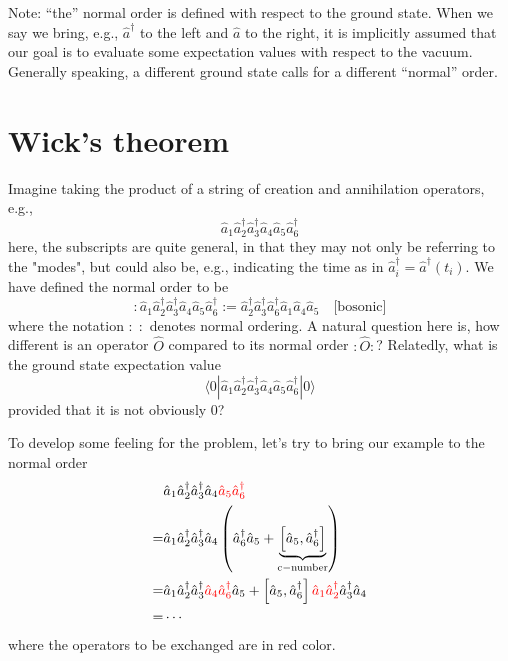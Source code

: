 Note: ``the'' normal order is defined with respect to the ground state. When we say we bring, e.g., $\hat{a}^\dagger$ to the left and $\hat{a}$ to the right, it is implicitly assumed that our goal is to evaluate some expectation values with respect to the vacuum. Generally speaking, a different ground state calls for a different ``normal'' order.

\section{Wick's theorem}

Imagine taking the product of a string of creation and annihilation operators, e.g.,
\[ \hat{a}_1\hat{a}_{2}^{\dagger}\hat{a}_{3}^{\dagger}\hat{a}_4\hat{a}_5\hat{a}_{6}^{\dagger}\]
here, the subscripts are quite general, in that they may not only be referring to the "modes", but could also be, e.g., indicating the time as in $\hat{a}_{i}^{\dagger}=\hat{a}^{\dagger}\left( t_i \right)$. We have defined the normal order to be
\[ :\hat{a}_1\hat{a}_{2}^{\dagger}\hat{a}_{3}^{\dagger}\hat{a}_4\hat{a}_5\hat{a}_{6}^{\dagger}:=\hat{a}_{2}^{\dagger}\hat{a}_{3}^{\dagger}\hat{a}_{6}^{\dagger}\hat{a}_1\hat{a}_4\hat{a}_5\quad [\mathrm{bosonic]}\]
where the notation $:\;:$ denotes normal ordering. A natural question here is, how different is an operator $\hat{O}$ compared to its normal order $:\hat{O}:$? Relatedly, what is the ground state expectation value
\[ \langle 0|\hat{a}_1\hat{a}_{2}^{\dagger}\hat{a}_{3}^{\dagger}\hat{a}_4\hat{a}_5\hat{a}_{6}^{\dagger}|0\rangle \]
provided that it is not obviously $0$?

To develop some feeling for the problem, let's try to bring our example to the normal order
\begin{align*}
    &\hat{a}_1\hat{a}_{2}^{\dagger}\hat{a}_{3}^{\dagger}\hat{a}_4{\color{red} \hat{a}_5\hat{a}_{6}^{\dagger}}\\
    =&\hat{a}_1\hat{a}_{2}^{\dagger}\hat{a}_{3}^{\dagger}\hat{a}_4\left( \hat{a}_{6}^{\dagger}\hat{a}_5+\underset{\mathrm{c}-\mathrm{number}}{\underbrace{\left[ \hat{a}_5,\hat{a}_{6}^{\dagger} \right] }} \right) \\
    =&\hat{a}_1\hat{a}_{2}^{\dagger}\hat{a}_{3}^{\dagger}{\color{red} \hat{a}_4\hat{a}_{6}^{\dagger}}\hat{a}_5+\left[ \hat{a}_5,\hat{a}_{6}^{\dagger} \right] {\color{red} \hat{a}_1\hat{a}_{2}^{\dagger}}\hat{a}_{3}^{\dagger}\hat{a}_4\\
    =&\cdots
\end{align*}
where the operators to be exchanged are in red color.

